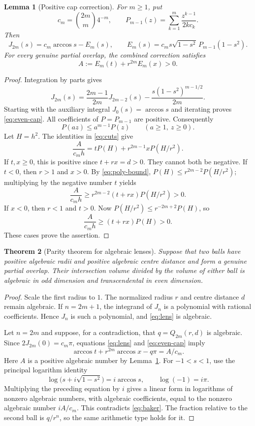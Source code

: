 \documentclass[11pt,a4paper]{article}
\numberwithin{equation}{section}
\newtheorem{theorem}{Theorem}[section]
\newtheorem{lemma}[theorem]{Lemma}
\theoremstyle{definition}
\theoremstyle{remark}
\begin{document}
\begin{lemma}[Positive cap correction]\label{lem:positive}
For $m\geq1$, put
\[
 c_m=\binom{2m}{m}4^{-m},\qquad
 P_{m-1}(z)=\sum_{k=1}^m\frac{z^{k-1}}{2k c_k}.
\]
Then
\begin{equation}\label{eq:even-cap}
 J_{2m}(s)=c_m\arccos s-E_m(s),\qquad
 E_m(s)=c_m s\sqrt{1-s^2}\,P_{m-1}(1-s^2).
\end{equation}
For every genuine partial overlap, the combined correction satisfies
\begin{equation}\label{eq:positive}
 A:=E_m(t)+r^{2m}E_m(x)>0.
\end{equation}
\end{lemma}
\begin{proof}
Integration by parts gives
\[
 J_{2m}(s)=\frac{2m-1}{2m}J_{2m-2}(s)
 -\frac{s(1-s^2)^{m-1/2}}{2m}.
\]
Starting with the auxiliary integral $J_0(s)=\arccos s$ and iterating proves \eqref{eq:even-cap}. All coefficients of $P=P_{m-1}$ are positive. Consequently
\begin{equation}\label{eq:poly-bound}
 P(az)\leq a^{m-1}P(z)\qquad(a\geq1,\ z\geq0).
\end{equation}
Let $H=h^2$. The identities in \eqref{eq:cuts} give
\[
 \frac{A}{c_mh}=tP(H)+r^{2m-1}xP(H/r^2).
\]
If $t,x\geq0$, this is positive since $t+rx=d>0$. They cannot both be negative. If $t<0$, then $r>1$ and $x>0$. By \eqref{eq:poly-bound}, $P(H)\leq r^{2m-2}P(H/r^2)$; multiplying by the negative number $t$ yields
\[
 \frac{A}{c_mh}\geq r^{2m-2}(t+rx)P(H/r^2)>0.
\]
If $x<0$, then $r<1$ and $t>0$. Now $P(H/r^2)\leq r^{-2m+2}P(H)$, so
\[
 \frac{A}{c_mh}\geq (t+rx)P(H)>0.
\]
These cases prove the assertion.
\end{proof}

\begin{theorem}[Parity theorem for algebraic lenses]\label{thm:lens}
Suppose that two balls have positive algebraic radii and positive algebraic centre distance and form a genuine partial overlap. Their intersection volume divided by the volume of either ball is algebraic in odd dimension and transcendental in even dimension.
\end{theorem}
\begin{proof}
Scale the first radius to $1$. The normalized radius $r$ and centre distance $d$ remain algebraic. If $n=2m+1$, the integrand of $J_n$ is a polynomial with rational coefficients. Hence $J_n$ is such a polynomial, and \eqref{eq:lens} is algebraic.

Let $n=2m$ and suppose, for a contradiction, that $q=Q_{2m}(r,d)$ is algebraic. Since $2J_{2m}(0)=c_m\pi$, equations \eqref{eq:lens} and \eqref{eq:even-cap} imply
\[
 \arccos t+r^{2m}\arccos x-q\pi=A/c_m.
\]
Here $A$ is a positive algebraic number by Lemma~\ref{lem:positive}. For $-1<s<1$, use the principal logarithm identity
\[
 \log\bigl(s+i\sqrt{1-s^2}\bigr)=i\arccos s,
 \qquad \log(-1)=i\pi.
\]
Multiplying the preceding equation by $i$ gives a linear form in logarithms of nonzero algebraic numbers, with algebraic coefficients, equal to the nonzero algebraic number $iA/c_m$. This contradicts \eqref{eq:baker}. The fraction relative to the second ball is $q/r^n$, so the same arithmetic type holds for it.
\end{proof}
\end{document}

